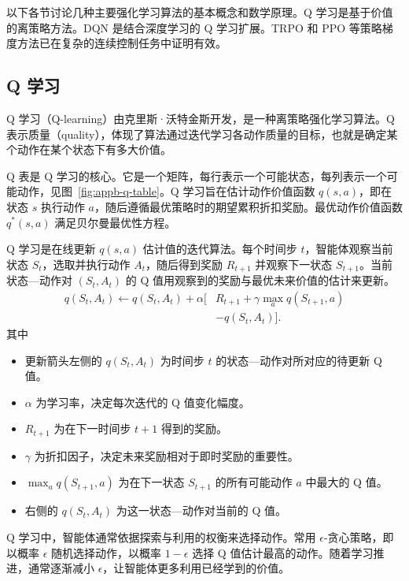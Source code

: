 以下各节讨论几种主要强化学习算法的基本概念和数学原理。Q 学习是基于价值的离策略方法。DQN 是结合深度学习的 Q 学习扩展。TRPO 和 PPO 等策略梯度方法已在复杂的连续控制任务中证明有效。

\subsection{Q 学习}
\label{sec:appb-q-learning}
Q 学习（Q-learning）由克里斯·沃特金斯开发，是一种离策略强化学习算法。Q 表示质量（quality），体现了算法通过迭代学习各动作质量的目标，也就是确定某个动作在某个状态下有多大价值。

Q 表是 Q 学习的核心。它是一个矩阵，每行表示一个可能状态，每列表示一个可能动作，见图~\ref{fig:appb-q-table}。Q 学习旨在估计动作价值函数 $q(s,a)$，即在状态 $s$ 执行动作 $a$，随后遵循最优策略时的期望累积折扣奖励。最优动作价值函数 $q^*(s,a)$ 满足贝尔曼最优性方程。


Q 学习是在线更新 $q(s,a)$ 估计值的迭代算法。每个时间步 $t$，智能体观察当前状态 $S_t$，选取并执行动作 $A_t$，随后得到奖励 $R_{t+1}$ 并观察下一状态 $S_{t+1}$。当前状态—动作对 $(S_t,A_t)$ 的 Q 值用观察到的奖励与最优未来价值的估计来更新。
\begin{equation}
\begin{aligned}
q(S_t,A_t)\leftarrow q(S_t,A_t)+\alpha\bigl[&
R_{t+1}+\gamma\max_a q(S_{t+1},a)\\
&-q(S_t,A_t)\bigr].
\end{aligned}
\label{eq:appb-q-update}
\end{equation}
其中
\begin{itemize}
\item 更新箭头左侧的 $q(S_t,A_t)$ 为时间步 $t$ 的状态—动作对所对应的待更新 Q 值。
\item $\alpha$ 为学习率，决定每次迭代的 Q 值变化幅度。
\item $R_{t+1}$ 为在下一时间步 $t+1$ 得到的奖励。
\item $\gamma$ 为折扣因子，决定未来奖励相对于即时奖励的重要性。
\item $\max_a q(S_{t+1},a)$ 为在下一状态 $S_{t+1}$ 的所有可能动作 $a$ 中最大的 Q 值。
\item 右侧的 $q(S_t,A_t)$ 为这一状态—动作对当前的 Q 值。
\end{itemize}

Q 学习中，智能体通常依据探索与利用的权衡来选择动作。常用 $\epsilon$-贪心策略，即以概率 $\epsilon$ 随机选择动作，以概率 $1-\epsilon$ 选择 Q 值估计最高的动作。随着学习推进，通常逐渐减小 $\epsilon$，让智能体更多利用已经学到的价值。

